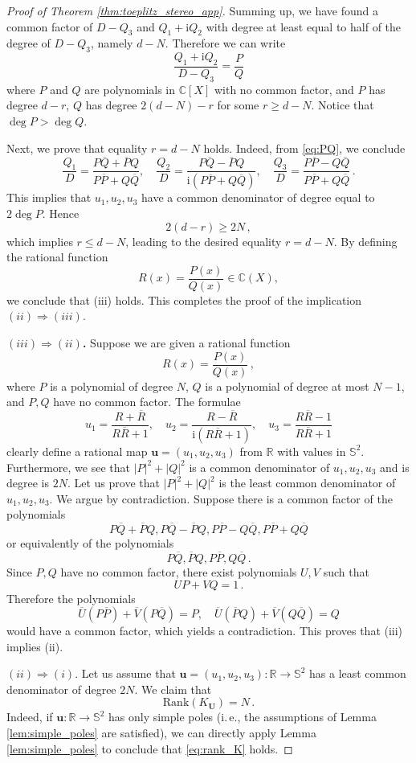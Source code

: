 \documentclass[10pt,a4paper]{amsart}
\newcommand{\C}{\mathbb{C}}
\newcommand{\R}{\mathbb{R}}
\newcommand{\Ss}{\mathbb{S}}
\newcommand{\Ub}{\mathbf{U}}
\newcommand{\be}{\begin{equation}}
\newcommand{\ee}{\end{equation}}
\newcommand{\ii}{\mathrm{i}}
\newcommand{\ov}{\overline}
\newcommand{\uu}{\mathbf{u}}
\renewcommand{\geq}{\geqslant}
\renewcommand{\leq}{\leqslant}
\begin{document}
\begin{proof}[Proof of Theorem \ref{thm:toeplitz_stereo_app}]
Summing up, we have found a common factor of $D-Q_3$ and $Q_1 + \ii Q_2$ with degree at least equal to half of the degree of $D-Q_3$, namely $d-N$. Therefore we can write
\be \label{eq:PQ}
\frac{Q_1 + \ii Q_2}{D-Q_3} = \frac{P}{Q}
\ee
where $P$ and $Q$ are polynomials in $\C[X]$ with no common factor, and $P$ has degree $d-r$, $Q$ has degree $2(d-N)-r$ for some $r \geq d-N$. Notice that $\deg P > \deg Q$.

Next, we prove that equality $r=d-N$ holds. Indeed, from \eqref{eq:PQ}, we conclude
$$
\frac{Q_1}{D} = \frac{P \ov{Q} + \ov{P} Q}{P \ov{P}+ Q \ov{Q}}, \quad \frac{Q_2}{D} = \frac{P \ov{Q}- \ov{P}Q}{\ii(P \ov{P} + Q \ov{Q})}, \quad \frac{Q_3}{D} = \frac{P \ov{P} - Q \ov{Q}}{P \ov{P}+ Q \ov{Q}} \, .
$$
This implies that $u_1, u_2, u_3$ have a common denominator of degree equal to $2 \deg P$. Hence
$$
2(d-r) \geq 2N \, ,
$$
which implies $r \leq d-N$, leading to the desired equality $r=d-N$. By defining the rational function
$$
R(x) = \frac{P(x)}{Q(x)}  \in \C(X),
$$
we conclude that (iii) holds. This completes the proof of the implication $(ii) \Rightarrow (iii)$.

\medskip
\textbf{$(iii) \Rightarrow (ii)$.} Suppose we are given a rational function
$$
R(x) = \frac{P(x)}{Q(x)} \, ,
$$
where $P$ is a polynomial of degree $N$, $Q$ is a polynomial of degree at most $N-1$, and $P, Q$ have no common factor. The formulae
$$
u_1 = \frac{R + \ov{R}}{R \ov{R}+1}, \quad u_2 = \frac{R - \ov{R}}{\ii (R \ov{R}+1)}, \quad u_3 = \frac{R \ov{R}-1}{R \ov{R}+1} 
$$
clearly define a rational map $\uu=(u_1,u_2, u_3)$ from $\R$ with values in $\Ss^2$. Furthermore, we see that $|P|^2 + |Q|^2$ is a common denominator of $u_1,u_2,u_3$ and is degree is $2N$. Let us prove that $|P|^2 + |Q|^2$ is the least common denominator of $u_1, u_2, u_3$. We argue by contradiction. Suppose there is a common factor of the polynomials
$$
P \ov{Q} + \ov{P} Q, P \ov{Q}- \ov{P} Q, P \ov{P} - Q \ov{Q}, P \ov{P}  + Q \ov{Q}
$$
or equivalently of the polynomials
$$
P \ov{Q}, \ov{P} Q, P \ov{P}, Q \ov {Q} \, .
$$
Since $P, Q$ have no common factor, there exist polynomials $U, V$ such that
$$
UP + VQ = 1 \, .
$$
Therefore the polynomials
$$
\ov{U} (P \ov{P} )+ \ov{V}(P \ov{Q}) = P, \quad \ov{U} (\ov{P} Q) + \ov{V} ( Q \ov{Q} ) = Q
$$
would have a common factor, which yields a contradiction. This proves that (iii) implies (ii).

\medskip
\textbf{$(ii) \Rightarrow (i).$} Let us assume that $\uu = (u_1, u_2, u_3) : \R \to \Ss^2$ has a least common denominator of degree $2N$. We claim that
\be \label{eq:rank_K}
\mathrm{Rank} (K_\Ub) = N \, .
\ee
Indeed, if $\uu : \R \to \Ss^2$ has only simple poles (i.\,e., the assumptions of Lemma \ref{lem:simple_poles} are satisfied), we can directly apply Lemma \ref{lem:simple_poles} to conclude that \eqref{eq:rank_K} holds.


\end{proof}
\end{document}
